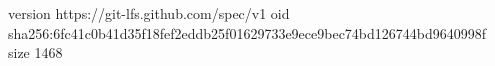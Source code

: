 version https://git-lfs.github.com/spec/v1
oid sha256:6fc41c0b41d35f18fef2eddb25f01629733e9ece9bec74bd126744bd9640998f
size 1468
